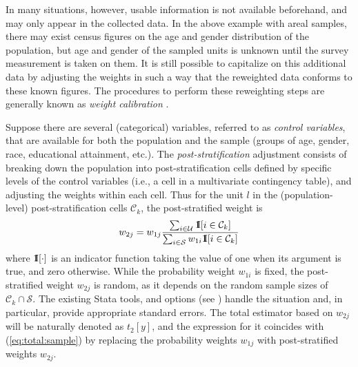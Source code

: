 In many situations, however, usable information is not available beforehand,
and may only appear in the collected data. In the above example with
areal samples, there may exist census figures on the age and gender
distribution of the population, but age and gender of the sampled units
is unknown until the survey measurement is taken on them.
It is still possible to capitalize on this additional data by
adjusting the weights in such a way that the reweighted data
conforms to these known figures. The procedures to perform these
reweighting steps are generally known as {\it weight calibration}
\citep{deville:sarndal:1992,deville:sarndal:sautory:1993,%
kott:2006,kott:2009,sarndal:2007}.

Suppose there are several (categorical) variables, referred to
as {\it control variables}, that are available for both
the population and the sample
(groups of age, gender, race, educational attainment, etc.).
The {\it post-stratification} adjustment consists of breaking down
the population into post-stratification cells defined
by specific levels of the control variables (i.e., a cell in a multivariate
contingency table), and adjusting the weights within each cell.
Thus for the unit $l$ in the (population-level) post-stratification cells $\mathcal{C}_k$, the post-stratified weight is
\begin{equation}
   w_{2j} = w_{1j} \frac%
        {\sum_{i \in \mathcal{U}} \One[i \in \mathcal{C}_k]}%
        {\sum_{i \in \mathcal{S}} w_{1i} \One[i \in \mathcal{C}_k]}%
   \label{eq:ps:weight}
\end{equation}
where ${\rm 1\kern-.3em I}[\cdot]$ is an indicator function taking the value of one
when its argument is true, and zero otherwise.
While the probability weight $w_{1i}$ is fixed, the post-stratified weight
$w_{2j}$ is random, as it depends on the random sample sizes of
$\mathcal{C}_k \cap \mathcal{S}$.
The existing Stata tools,  and 
options (see ) handle the situation and,
in particular, provide appropriate standard errors. The total estimator
based on $w_{2j}$ will be naturally denoted as $t_2[y]$, and the expression
for it coincides with (\ref{eq:total:sample}) by replacing the probability
weights $w_{1j}$ with post-stratified weights $w_{2j}$.

